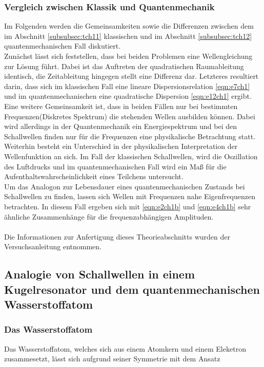 \subsubsection{Vergleich zwischen Klassik und Quantenmechanik}
\label{subsubsec:tch13}
Im Folgenden werden die Gemeinsamkeiten sowie die Differenzen zwischen
dem im Abschnitt \ref{subsubsec:tch11} klassischen und im Abschnitt
\ref{subsubsec:tch12} quantenmechanischen Fall diskutiert.\\
Zunächst lässt sich feststellen, dass bei beiden Problemen eine
Wellengleichung zur Lösung führt. Dabei ist das Auftreten der
quadratischen Raumableitung identisch, die Zeitableitung hingegen stellt
eine Differenz dar. Letzteres resultiert darin, dass sich im klassischen
Fall eine lineare Dispersionsrelation \eqref{eqn:e7ch1}
und im quantenmechanischen eine quadratische Dispersion \eqref{eqn:e12ch1}
ergibt.\\
Eine weitere Gemeinsamkeit ist, dass in beiden Fällen nur bei bestimmten Frequenzen(Diskretes Spektrum)
die stehenden Wellen ausbilden können. Dabei wird allerdings in der Quantenmechanik ein Energiespektrum
und bei den Schallwellen finden nur für die Frequenzen eine physikalische Betrachtung statt.
Weiterhin besteht ein Unterschied in der physikalischen Interpretation der Wellenfunktion an sich.
Im Fall der klassischen Schallwellen, wird die Oszillation des Luftdrucks und im quantenmechanischen
Fall wird ein Maß für die Aufenthaltswahrscheinlichkeit eines Teilchens untersucht.\\
Um das Analogon zur Lebensdauer eines quantenmechanischen Zustands bei Schallwellen zu finden, lassen sich
Wellen mit Frequenzen nahe Eigenfrequenzen betrachten. In diesem Fall ergeben sich mit \eqref{eqn:e2ch1b} und \eqref{eqn:e4ch1b}
sehr ähnliche Zusammenhänge für die frequenzabhängigen Amplituden.\\ \\
Die Informationen zur Anfertigung dieses Theorieabschnitts wurden der Versuchsanleitung \cite{sample1}
entnommen.


\subsection{Analogie von Schallwellen in einem Kugelresonator und dem quantenmechanischen Wasserstoffatom}
\label{subsec:tch2}

\subsubsection{Das Wasserstoffatom}
\label{subsubsec:tch21}
Das Wasserstoffatom, welches sich aus einem Atomkern und einem Eleketron zusammesetzt, lässt sich aufgrund
seiner Symmetrie mit dem Ansatz

